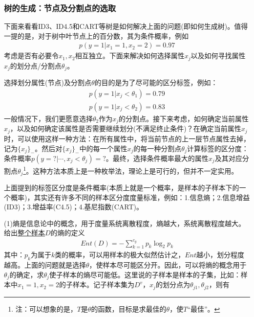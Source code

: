         \subsubsection{树的生成：节点及分割点的选取}
            \par
            下面来看看ID3、ID4.5和CART等树是如何解决上面的问题(即如何生成树)。值得一提的是，对于树中叶节点上的百分数，其为条件概率，例如
            \begin{align*}
            p(y=1|x_1=1,x_2=2) = 0.97
            \end{align*}
            考虑是否有必要令$x_1,x_2$相互独立。下面来解决如何选择属性$x_j$以及如何寻找属性$x_j$的划分点/分割点$\theta_j$。
            \par
            选择划分属性(节点)及分割点$\theta$的目的是为了尽可能的区分标签，例如：
            \begin{align*}
            p(y=1|x_j <\theta_1) = 0.79\\
            p(y=1|x_j <\theta_2) = 0.83
            \end{align*}
            一般情况下，我们更愿意选择$\theta_2$作为$x_j$的分割点。接下来考虑，如何确定当前属性$x_j$，以及如何确定该属性是否需要继续划分(不满足终止条件)？在确定当前属性$x_j$时，可以使用这样一种方法：在所有属性中，将当前节点的上一层节点属性去掉，记为$\{x_j\}_-$。然后对$\{x_j\}_-$中的每一个属性$x_j$的每一种分割点$\theta_j$计算标签的区分度：条件概率$p(y=?|\cdots,x_j<\theta_j)=?$。最终，选择条件概率最大的属性$x_j$及其对应分割点$\theta_j$\footnote{注：可以想象的是，$T$是$\theta$的函数，目标是求最佳的$\theta$，使$T$“最佳”。}。这种方法本质上是一种枚举法，理论上是可行的，但并不一定实用。
            \par
            上面提到的标签区分度是条件概率(本质上就是一个概率，是样本的子样本下的一个概率)，其实还有许多不同的样本区分度度量标准，例如：1.信息熵；2.信息增益(ID3)；3.增益率(C4.5)；4.基尼指数(CART)。
            \par
            (1)熵是信息论中的概念，用于度量系统离散程度，熵越大，系统离散程度越大。给出\underline{整个样本$D$}的熵的定义
            \begin{align*}
            Ent(D) = -\sum_{k=1}^{c_y}p_k \log_2 p_k
            \end{align*}
            其中：$p_k$为属于$k$类的概率，可以用样本的极大似然估计之，$Ent$越小，划分程度越高。上面的问题就是选择$\theta$，使样本尽可能区分开。因此，可以将熵的概念用于$\theta_j$的确定，求$\theta_j$使子样本的熵尽可能低。这里说的子样本是样本的子集，比如：样本中$x_1 = 1,x_2 = 2$的子样本。记子样本集为$D^v$，$x_j$的划分点为$\theta_{j1},\theta_{j2}$，则有
